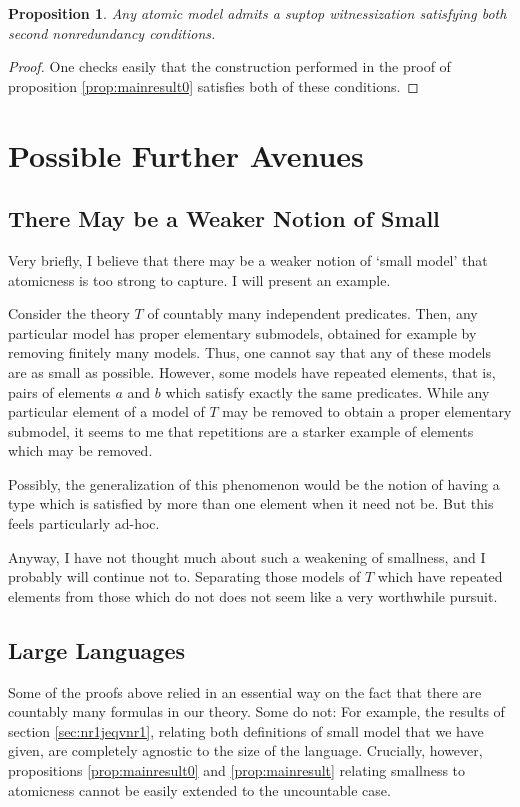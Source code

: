 \documentclass{article}
\newtheorem{prop}[theorem]{Proposition}
\theoremstyle{nonumberplain}
\newtheorem{proof}{Proof}
\begin{document}
\begin{prop}
Any atomic model admits a suptop witnessization satisfying both second nonredundancy conditions.
\end{prop}

\begin{proof}
One checks easily that the construction performed in the proof of proposition \ref{prop:mainresult0} satisfies both of these conditions.
\end{proof}

\section{Possible Further Avenues}

\subsection{There May be a Weaker Notion of Small}\label{sec:evensmaller}

Very briefly, I believe that there may be a weaker notion of `small model' that atomicness is too strong to capture. I will present an example.

Consider the theory $T$ of countably many independent predicates. Then, any particular model has proper elementary submodels, obtained for example by removing finitely many models. Thus, one cannot say that any of these models are as small as possible. However, some models have repeated elements, that is, pairs of elements $a$ and $b$ which satisfy exactly the same predicates. While any particular element of a model of $T$ may be removed to obtain a proper elementary submodel, it seems to me that repetitions are a starker example of elements which may be removed.

Possibly, the generalization of this phenomenon would be the notion of having a type which is satisfied by more than one element when it need not be. But this feels particularly ad-hoc.

Anyway, I have not thought much about such a weakening of smallness, and I probably will continue not to. Separating those models of $T$ which have repeated elements from those which do not does not seem like a very worthwhile pursuit.

\subsection{Large Languages}

Some of the proofs above relied in an essential way on the fact that there are countably many formulas in our theory. Some do not: For example, the results of section \ref{sec:nr1jeqvnr1}, relating both definitions of small model that we have given, are completely agnostic to the size of the language. Crucially, however, propositions \ref{prop:mainresult0} and \ref{prop:mainresult} relating smallness to atomicness cannot be easily extended to the uncountable case.
\end{document}
